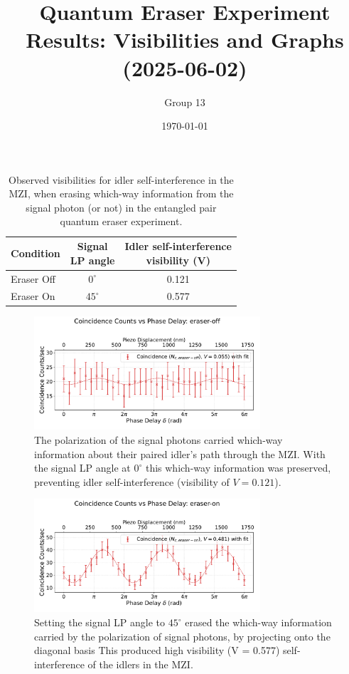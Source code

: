 \documentclass{article}
\title{Quantum Eraser Experiment Results: Visibilities and Graphs (2025-06-02)}
\author{Group 13} %
\date{\today}
\begin{document}
\pagestyle{empty} %

%

\begin{table}[h!]
\centering
\begin{tabular}{lcc}
\toprule
Condition & \makecell{Signal \\ LP angle} & \makecell{Idler self-interference \\ visibility (V)} \\
\midrule
Eraser Off         & $0^\circ$ & 0.121 \\
Eraser On          & $45^\circ$  & 0.577 \\
\bottomrule
\end{tabular}
\caption*{
  Observed visibilities for idler self-interference in the MZI,
  when erasing which-way information from the signal photon (or not)
  in the entangled pair quantum eraser experiment.}
\end{table}

\begin{figure}[h!]
\centering
\includegraphics[width=0.75\textwidth]{coincidence_counts_eraser_off.pdf}
\caption*{
  The polarization of the signal photons carried which-way information about
  their paired idler's path through the MZI.
  With the signal LP angle at $0^\circ$ this which-way information was preserved,
  preventing idler self-interference (visibility of $V=0.121$).
}
\end{figure}

\begin{figure}[h!]
\centering
\includegraphics[width=0.75\textwidth]{coincidence_counts_eraser_on.pdf}
\caption*{
  Setting the signal LP angle to $45^\circ$ erased the which-way
  information carried by the polarization of signal photons,
  by projecting
  onto the diagonal basis
  This produced high visibility (V = 0.577) self-interference of the
  idlers in the MZI.
}
\end{figure}
\end{document}
